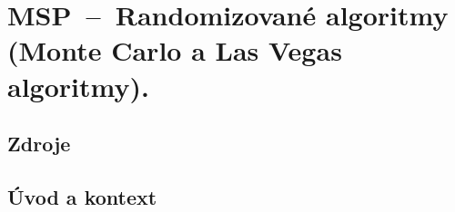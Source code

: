 

\graphicspath{{msp/randomizovane_algoritmy/figures}}


\chapter{MSP~--~Randomizované algoritmy (Monte Carlo a Las Vegas algoritmy).}


\section{Zdroje}

\begin{compactitem}
    \item {}
    \item {}
\end{compactitem}


\section{Úvod a kontext}
